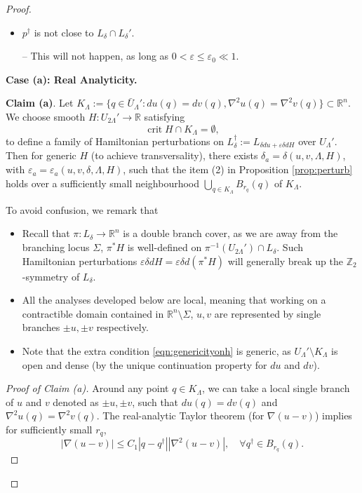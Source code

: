 \documentclass[11pt,a4paper]{article}
\numberwithin{equation}{section}%
\theoremstyle{definition}
\newcommand{\R}{\mathbb{R}}
\newcommand{\Z}{\mathbb{Z}}
\begin{document}
\begin{proof}
\begin{itemize}
       -- Using the asymptote near the branch set, we can rule out this possibility. 
       
       \item [(d)] $p^\dagger $ is not close to $L_\delta\cap L_\delta'$. 
       
       -- This will not happen, as long as $0<\varepsilon\leqslant \varepsilon_0\ll 1$. 
       
   \end{itemize}

\textbf{Case (a): Real Analyticity.} 
   
    \textbf{Claim (a)}. Let $K_\Lambda:=\{q\in \bar U_{\Lambda}':du(q)=dv(q),\nabla^2u(q)=\nabla^2v(q)\}\subset \R^n$.  We choose smooth $H:U_{2\Lambda}'\to \R$ satisfying
    \begin{equation}\label{eqn:genericityonh}
        \operatorname{crit}H\cap K_{\Lambda}=\emptyset,
    \end{equation}
   to define a family of Hamiltonian perturbations on  $L_{\delta}^\dagger:=L_{\delta du+\varepsilon \delta dH}$ over $U_{\Lambda}'$. Then for generic $H$ (to achieve transversality), there exists $\delta_a=\delta(u,v,\Lambda,H)$, with $\varepsilon_a=\varepsilon_a(u,v,\delta,\Lambda,H)$, such that the item (2) in Proposition \ref{prop:perturb} holds over a sufficiently small neighbourhood $\bigcup\limits_{q\in K_\Lambda}B_{r_q}(q)$ of $K_\Lambda$. 
    
    To avoid confusion, we remark that 
    \begin{itemize}
        \item Recall that $\pi:L_\delta\to \R^n$ is a double branch cover, as we are away from the branching locus $\Sigma$, $\pi^*H$ is well-defined on $\pi^{-1}(U_{2\Lambda}')\cap L_\delta$. Such Hamiltonian perturbations $\varepsilon\delta dH=\varepsilon\delta d(\pi^*H)$ will generally break up the $\Z_2$-symmetry of $L_\delta$.  
        \item All the analyses developed below are local, meaning that working on a contractible domain contained in $\R^n\setminus\Sigma$, $u,v$ are represented by single branches $\pm u,\pm v$ respectively.   
        \item Note that the extra condition \eqref{eqn:genericityonh} is generic, as $U_\Lambda' \setminus K_{\Lambda} $ is open and dense (by the unique continuation property for $du$ and $dv$). 
    \end{itemize}
    
    

   \begin{proof}[Proof of Claim (a)]
        Around any point $q\in K_\Lambda$, we can take a local single branch of $u$ and $v$ denoted as $\pm u,\pm v$, such that $du(q)=dv(q)$ and $\nabla^2u(q)=\nabla^2v(q)$. The real-analytic Taylor theorem \cite[Theorem A.1]{IJS} (for $\nabla(u-v)$) implies for sufficiently small $r_q$, $$| \nabla (u-v)|\leqslant C_1 |q-q^{\dagger}|| \nabla^2 (u-v)|,\quad \forall q^{\dagger}\in B_{r_q}(q).$$
    

\end{proof}
\end{proof}
\end{document}
